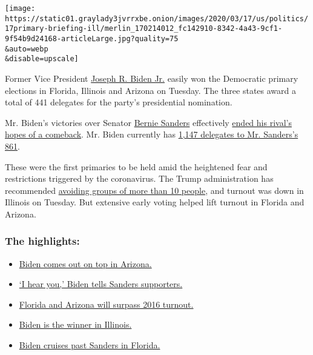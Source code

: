 \texttt{[image: https://static01.graylady3jvrrxbe.onion/images/2020/03/17/us/politics/17primary-briefing-ill/merlin\_170214012\_fc142910-8342-4a43-9cf1-9f54b9d24168-articleLarge.jpg?quality=75\\\&auto=webp\\\&disable=upscale]}

Former Vice President
\href{https://www.nytimes3xbfgragh.onion/interactive/2020/us/elections/joe-biden.html}{Joseph
R. Biden Jr.} easily won the Democratic primary elections in Florida,
Illinois and Arizona on Tuesday. The three states award a total of 441
delegates for the party's presidential nomination.

Mr. Biden's victories over Senator
\href{https://www.nytimes3xbfgragh.onion/interactive/2020/us/elections/bernie-sanders.html}{Bernie
Sanders} effectively
\href{https://www.nytimes3xbfgragh.onion/2020/03/17/us/politics/biden-florida-illinois-primary.html}{ended
his rival's hopes of a comeback}. Mr. Biden currently has
\href{https://www.nytimes3xbfgragh.onion/interactive/2020/us/elections/delegate-count-primary-results.html}{1,147
delegates to Mr. Sanders's 861}.

These were the first primaries to be held amid the heightened fear and
restrictions triggered by the coronavirus. The Trump administration has
recommended
\href{https://www.nytimes3xbfgragh.onion/2020/03/16/world/live-coronavirus-news-updates.html?action=click\&module=Spotlight\&pgtype=Homepage}{avoiding
groups of more than 10 people}, and turnout was down in Illinois on
Tuesday. But extensive early voting helped lift turnout in Florida and
Arizona.

\hypertarget{the-highlights}{%
\subsubsection{The highlights:}\label{the-highlights}}

\begin{itemize}
\tightlist
\item
  \protect\hyperlink{link-58c71c58}{Biden comes out on top in Arizona.}
\item
  \protect\hyperlink{link-25373fb4}{`I hear you,' Biden tells Sanders
  supporters.}
\item
  \protect\hyperlink{link-2e84c23f}{Florida and Arizona will surpass
  2016 turnout.}
\item
  \protect\hyperlink{link-402054e}{Biden is the winner in Illinois.}
\item
  \protect\hyperlink{link-7e0a4a3e}{Biden cruises past Sanders in
  Florida.}
\end{itemize}

